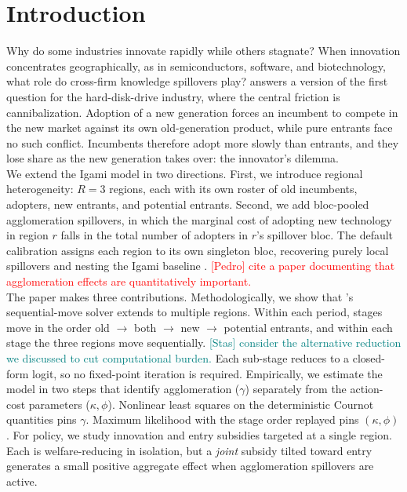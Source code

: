 \section{Introduction}

Why do some industries innovate rapidly while others stagnate? When
innovation concentrates geographically, as in semiconductors, software, and
biotechnology, what role do cross-firm knowledge spillovers play?
\citet{igami_estimating_2017} answers a version of the first question for
the hard-disk-drive industry, where the central friction is cannibalization.
Adoption of a new generation forces an incumbent to compete in the new
market against its own old-generation product, while pure entrants face no
such conflict. Incumbents therefore adopt more slowly than entrants, and
they lose share as the new generation takes over: the innovator's dilemma.\\

We extend the Igami model in two directions. First, we introduce regional
heterogeneity: $R = 3$ regions, each with its own roster of old incumbents,
adopters, new entrants, and potential entrants. Second, we add bloc-pooled
agglomeration spillovers, in which the marginal cost of adopting new
technology in region $r$ falls in the total number of adopters in $r$'s
spillover bloc. The default calibration assigns each region to its own
singleton bloc, recovering purely local spillovers and nesting the Igami
baseline \citep{carlino_kerr_2015_agglomeration}. \textcolor{red}{[Pedro]
cite a paper documenting that agglomeration effects are quantitatively
important.}\\

The paper makes three contributions. Methodologically, we show that
\citeauthor{igami_estimating_2017}'s sequential-move solver extends to
multiple regions. Within each period, stages move in the order old $\to$
both $\to$ new $\to$ potential entrants, and within each stage the three
regions move sequentially. \textcolor{teal}{[Stas] consider the alternative
reduction we discussed to cut computational burden.} Each sub-stage reduces
to a closed-form logit, so no fixed-point iteration is required.
Empirically, we estimate the model in two steps that identify agglomeration
($\gamma$) separately from the action-cost parameters ($\kappa, \phi$).
Nonlinear least squares on the deterministic Cournot quantities pins
$\gamma$. Maximum likelihood with the stage order replayed pins
$(\kappa, \phi)$. For policy, we study innovation and entry subsidies
targeted at a single region. Each is welfare-reducing in isolation, but a
\emph{joint} subsidy tilted toward entry generates a small positive
aggregate effect when agglomeration spillovers are active.
